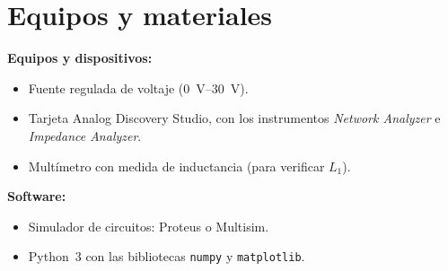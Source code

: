 \documentclass[11pt,a4paper]{article}
\begin{document}
\FloatBarrier
\section{Equipos y materiales}
\noindent\textbf{Equipos y dispositivos:}
\begin{itemize}
    \item Fuente regulada de voltaje (\qtyrange{0}{30}{\volt}).
    \item Tarjeta Analog Discovery Studio, con los instrumentos \emph{Network
          Analyzer} e \emph{Impedance Analyzer}.
    \item Multímetro con medida de inductancia (para verificar $L_1$).
\end{itemize}

\noindent\textbf{Software:}
\begin{itemize}
    \item Simulador de circuitos: Proteus o Multisim.
    \item Python~3 con las bibliotecas \texttt{numpy} y \texttt{matplotlib}.
\end{itemize}
\end{document}
